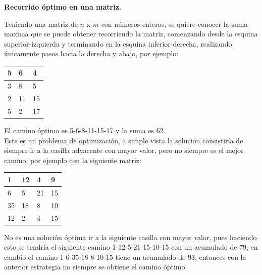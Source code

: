 \documentclass[12pt, a4paper]{article}
\newcommand{\subtitulo}[1]{\begin{center}\textbf{#1}\end{center}}
\begin{document}
	\subtitulo{Recorrido óptimo en una matriz.}
	
	Teniendo una matriz de $n$ x $m$ con números enteros, se quiere conocer la suma maxima que se puede obtener
	recorriendo la matriz, comenzando desde la esquina superior-izquierda y terminando en la esquina inferior-derecha,
	realizando únicamente pasos hacia la derecha y abajo, por ejemplo:\\
	\begin{center}
		\begin{tabular}{|l|l|l|}
			\hline
			5  &6 &4 \\ \hline
			3  &8  &5 \\ \hline
			2 &11 &15 \\ \hline
			5 &2  &17 \\ \hline
		\end{tabular}
	\end{center}
	El camino óptimo es 5-6-8-11-15-17 y la suma es 62.\\
	
	Este es un problema de optimización, a simple vista la solución consistiría de siempre ir a la casilla adyacente
	con mayor valor, pero no siempre es el mejor camino, por ejemplo con la siguiente matriz:
	\begin{center}
		\begin{tabular}{|l|l|l|l|}
		 	\hline
			1  & 12 & 4  & 9 \\ \hline
			6  & 5  & 21 & 15 \\ \hline
			35 & 18 & 8  & 10 \\ \hline
			12 & 2  & 4  & 15 \\ \hline
		\end{tabular}
	\end{center}
	No es una solución óptima ir a la siguiente casilla con mayor valor, pues haciendo esto se tendría el siguiente
	camino 1-12-5-21-15-10-15 con un acumulado de 79, en cambio el camino 1-6-35-18-8-10-15 tiene un acumulado de 93,
	entonces con la anterior estrategia no siempre se obtiene el camino óptimo.\\
	
\end{document}
